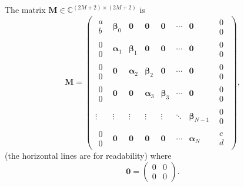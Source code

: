 \documentclass[]{article}
\begin{document}
	The matrix $\mathbf{M}\in\mathbb{C}^{(2M+2)\times(2M+2)}$ is 
	\begin{equation}
		\mathbf{M}=
		\begin{pmatrix}
			\begin{matrix}a\\b\end{matrix}&\bm{\beta}_0&\bm{0}&\mathbf{0}&\mathbf{0}&\cdots&\mathbf{0}&\begin{matrix}0\\0\end{matrix}\\
			\hline
			\begin{matrix}0\\0\end{matrix}&\bm{\alpha}_1&\bm{\beta}_1&\mathbf{0}&\mathbf{0}&\cdots&\mathbf{0}&\begin{matrix}0\\0\end{matrix}\\
			\hline 
			\begin{matrix}0\\0\end{matrix}&\mathbf{0}&\bm{\alpha}_2&\bm{\beta}_2&\mathbf{0}&\cdots&\mathbf{0}&\begin{matrix}0\\0\end{matrix}\\
			\hline
			\begin{matrix}0\\0\end{matrix}&\mathbf{0}&\mathbf{0}&\bm{\alpha}_3&\bm{\beta}_3&\cdots&\mathbf{0}&\begin{matrix}0\\0\end{matrix}\\
			\hline
			\vdots&\vdots&\vdots&\vdots&\vdots&\ddots&\bm{\beta}_{N-1}&\begin{matrix}0\\0\end{matrix}\\
			\hline
			\begin{matrix}0\\0\end{matrix}&\mathbf{0}&\mathbf{0}&\mathbf{0}&\mathbf{0}&\cdots&\bm{\alpha}_{N}&\begin{matrix}c\\d\end{matrix}
		\end{pmatrix},
	\end{equation}
	(the horizontal lines are for readability) where 
	\begin{equation}
		\mathbf{0}=\begin{pmatrix}0&0\\0&0\end{pmatrix}.
	\end{equation}
\end{document}
